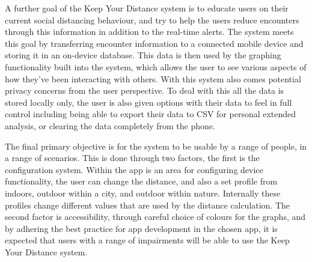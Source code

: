 \documentclass{l4proj}
\begin{document}
A further goal of the Keep Your Distance system is to educate users on their current social distancing behaviour, and try to help the users reduce encounters through this information in addition to the real-time alerts. The system meets this goal by transferring encounter information to a connected mobile device and storing it in an on-device database. This data is then used by the graphing functionality built into the system, which allows the user to see various aspects of how they've been interacting with others. With this system also comes potential privacy concerns from the user perspective. To deal with this all the data is stored locally only, the user is also given options with their data to feel in full control including being able to export their data to CSV for personal extended analysis, or clearing the data completely from the phone.

The final primary objective is for the system to be usable by a range of people, in a range of scenarios. This is done through two factors, the first is the configuration system. Within the app is an area for configuring device functionality, the user can change the distance, and also a set profile from indoors, outdoor within a city, and outdoor within nature. Internally these profiles change different values that are used by the distance calculation. The second factor is accessibility, through careful choice of colours for the graphs, and by adhering the best practice for app development in the chosen app, it is expected that users with a range of impairments will be able to use the Keep Your Distance system.
\end{document}
